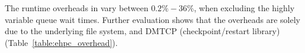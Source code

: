 The runtime overheads in \systemname vary between $0.2 \% - 36 \%$, when excluding the
highly variable queue wait times. Further evaluation shows that the overheads are solely
due to the underlying file system, and DMTCP (checkpoint/restart library) (Table~\ref{table:ehpc_overhead}).

%
%

